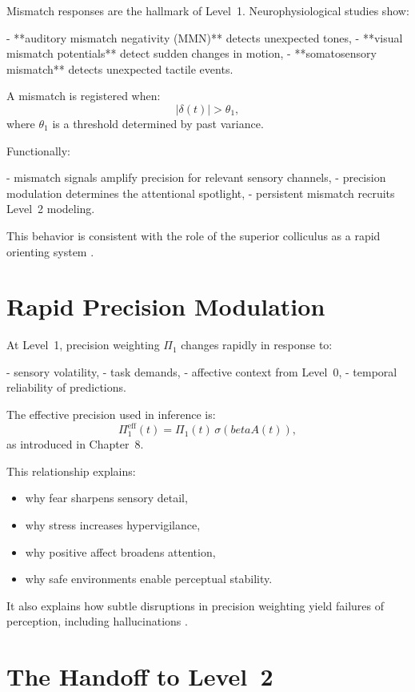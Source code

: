 \documentclass[12pt,oneside]{book}
\theoremstyle{plain}
\theoremstyle{definition}
\let\citep\parencite
\def\beta{beta}%
\begin{document}
Mismatch responses are the hallmark of Level~1.
Neurophysiological studies show:

- **auditory mismatch negativity (MMN)** detects unexpected tones,
- **visual mismatch potentials** detect sudden changes in motion,
- **somatosensory mismatch** detects unexpected tactile events.

A mismatch is registered when:
\[
|\delta(t)| > \theta_1,
\]
where $\theta_1$ is a threshold determined by past variance.

Functionally:

- mismatch signals amplify precision for relevant sensory channels,
- precision modulation determines the attentional spotlight,
- persistent mismatch recruits Level~2 modeling.

This behavior is consistent with the role of the superior colliculus as a
rapid orienting system \citep{stein2008new}.

\section{Rapid Precision Modulation}

At Level~1, precision weighting $\Pi_{1}$ changes rapidly in response to:

- sensory volatility,
- task demands,
- affective context from Level~0,
- temporal reliability of predictions.

The effective precision used in inference is:
\[
\Pi_{1}^{\mathrm{eff}}(t)
  = \Pi_{1}(t) \, \sigma(\beta A(t)),
\]
as introduced in Chapter~8.

This relationship explains:

\begin{itemize}
  \item why fear sharpens sensory detail,
  \item why stress increases hypervigilance,
  \item why positive affect broadens attention,
  \item why safe environments enable perceptual stability.
\end{itemize}

It also explains how subtle disruptions in precision weighting yield
failures of perception, including hallucinations
\citep{friston2016active,corlett2019hallucinations}.

\section{The Handoff to Level~2}
\end{document}
